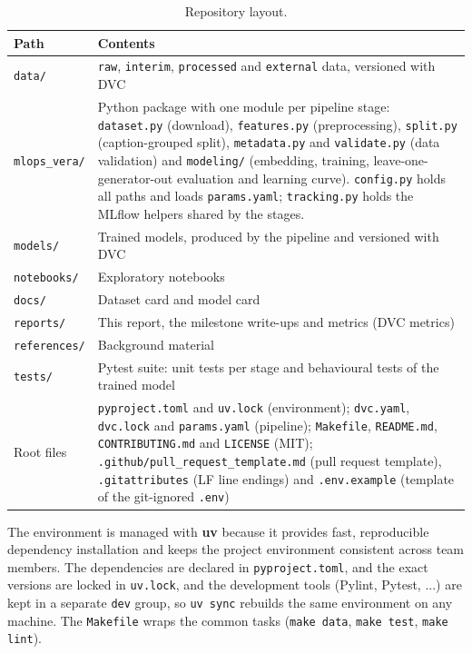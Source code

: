 \documentclass[11pt]{article}
\begin{document}
\begin{table}[H]
\centering
\small
\begin{tabularx}{\textwidth}{@{}l Y@{}}
\toprule
\textbf{Path} & \textbf{Contents} \\
\midrule
\texttt{data/} & \texttt{raw}, \texttt{interim}, \texttt{processed} and \texttt{external} data, versioned with DVC \\
\texttt{mlops\_vera/} & Python package with one module per pipeline stage: \texttt{dataset.py} (download), \texttt{features.py} (preprocessing), \texttt{split.py} (caption-grouped split), \texttt{metadata.py} and \texttt{validate.py} (data validation) and \texttt{modeling/} (embedding, training, leave-one-generator-out evaluation and learning curve). \texttt{config.py} holds all paths and loads \texttt{params.yaml}; \texttt{tracking.py} holds the MLflow helpers shared by the stages. \\
\texttt{models/} & Trained models, produced by the pipeline and versioned with DVC \\
\texttt{notebooks/} & Exploratory notebooks \\
\texttt{docs/} & Dataset card and model card \\
\texttt{reports/} & This report, the milestone write-ups and metrics (DVC metrics) \\
\texttt{references/} & Background material \\
\texttt{tests/} & Pytest suite: unit tests per stage and behavioural tests of the trained model \\
Root files & \texttt{pyproject.toml} and \texttt{uv.lock} (environment); \texttt{dvc.yaml}, \texttt{dvc.lock} and \texttt{params.yaml} (pipeline); \texttt{Makefile}, \texttt{README.md}, \texttt{CONTRIBUTING.md} and \texttt{LICENSE} (MIT); \texttt{.github/\allowbreak pull\_request\_template.md} (pull request template), \texttt{.gitattributes} (LF line endings) and \texttt{.env.example} (template of the git-ignored \texttt{.env}) \\
\bottomrule
\end{tabularx}
\caption{Repository layout.}
\label{tab:structure}
\end{table}


The environment is managed with \textbf{uv} because it provides fast, reproducible dependency installation and keeps the project environment consistent across team members. The dependencies are declared in \texttt{pyproject.toml}, and the exact versions are locked in \texttt{uv.lock}, and the development tools (Pylint, Pytest, ...) are kept in a separate \texttt{dev} group, so \texttt{uv sync} rebuilds the same environment on any machine. The \texttt{Makefile} wraps the common tasks (\texttt{make data}, \texttt{make test}, \texttt{make lint}).
\medskip
\end{document}
